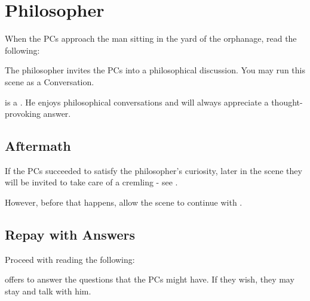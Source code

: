 \section{Philosopher}
\label{sec:philosopher}

When the PCs approach the man sitting in the yard of the orphanage, read the following:


The philosopher invites the PCs into a philosophical discussion. You may run this scene as a Conversation.

\npcArclo{} is a \enemySleeplessC{}. 
He enjoys philosophical conversations and will always appreciate a thought-provoking answer.


\subsection{Aftermath}

If the PCs succeeded to satisfy the philosopher's curiosity, later in the scene they will be invited to take care of a cremling - see .

However, before that happens, allow the scene to continue with .



\subsection{Repay with Answers}
\label{ssec:philosopherAnswers}

Proceed with reading the following:

\newpage

\npcArclo{} offers to answer the questions that the PCs might have. If they wish, they may stay and talk with him.

